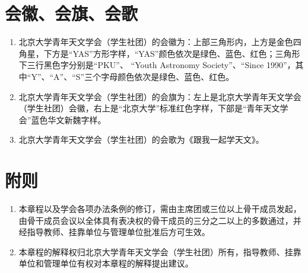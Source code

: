 \section{会徽、会旗、会歌}

\begin{enumerate}[resume]
    \item 北京大学青年天文学会（学生社团）的会徽为：上部三角形内，上方是金色四角星，下方是“YAS”方形字样，“YAS”颜色依次是绿色、蓝色、红色；三角形下三行黑色字分别是“PKU”、 “Youth Astronomy Society”、“Since 1990”，其中“Y”、“A”、“S”三个字母颜色依次是绿色、蓝色、红色。
    
    \item 北京大学青年天文学会（学生社团）的会旗为：左上是北京大学青年天文学会（学生社团）会徽，右上是“北京大学”标准红色字样，下部是“青年天文学会”蓝色华文新魏字样。
    
    \item 北京大学青年天文学会（学生社团）的会歌为《跟我一起学天文》。
\end{enumerate}

\section{附则}

\begin{enumerate}[resume]
    \item 本章程以及学会各项办法条例的修订，需由主席团或三位以上骨干成员发起，由骨干成员会议以全体具有表决权的骨干成员的三分之二以上的多数通过，并经指导教师、挂靠单位与管理单位批准后方可生效。
    
    \item 本章程的解释权归北京大学青年天文学会（学生社团）所有，指导教师、挂靠单位和管理单位有权对本章程的解释提出建议。
\end{enumerate}